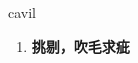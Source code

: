
\begin{frame}
{\huge cavil}
\begin{center}
\begin{enumerate}\Large
  \item \textbf{挑剔，吹毛求疵}
\end{enumerate}
\end{center}
\end{frame}
